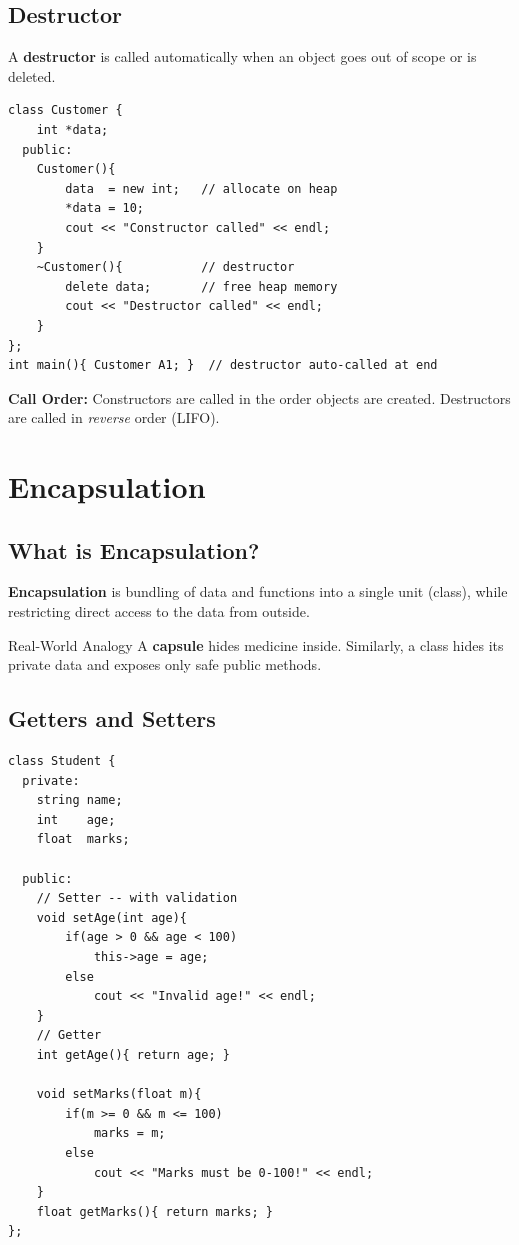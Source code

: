 \documentclass[12pt,a4paper]{report}
\begin{document}
\section{Destructor}

A \textbf{destructor} is called automatically when an object goes out of scope or is deleted.

\begin{lstlisting}[caption={Destructor -- free dynamic memory}]
class Customer {
    int *data;
  public:
    Customer(){
        data  = new int;   // allocate on heap
        *data = 10;
        cout << "Constructor called" << endl;
    }
    ~Customer(){           // destructor
        delete data;       // free heap memory
        cout << "Destructor called" << endl;
    }
};
int main(){ Customer A1; }  // destructor auto-called at end
\end{lstlisting}

\begin{notebox}
\textbf{Call Order:} Constructors are called in the order objects are created.
Destructors are called in \textit{reverse} order (LIFO).
\end{notebox}

\chapter{Encapsulation}

\section{What is Encapsulation?}

\textbf{Encapsulation} is bundling of data and functions into a single unit (class), while restricting direct access to the data from outside.

\begin{conceptbox}{Real-World Analogy}
A \textbf{capsule} hides medicine inside. Similarly, a class hides its private data and exposes only safe public methods.
\end{conceptbox}

\section{Getters and Setters}

\begin{lstlisting}[caption={Encapsulation with getter and setter}]
class Student {
  private:
    string name;
    int    age;
    float  marks;

  public:
    // Setter -- with validation
    void setAge(int age){
        if(age > 0 && age < 100)
            this->age = age;
        else
            cout << "Invalid age!" << endl;
    }
    // Getter
    int getAge(){ return age; }

    void setMarks(float m){
        if(m >= 0 && m <= 100)
            marks = m;
        else
            cout << "Marks must be 0-100!" << endl;
    }
    float getMarks(){ return marks; }
};
\end{lstlisting}
\end{document}
